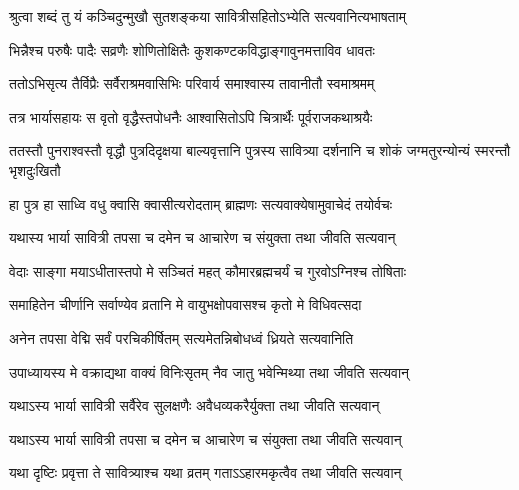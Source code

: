 \begin{center}
\twolineshloka
{श्रुत्वा शब्दं तु यं कञ्चिदुन्मुखौ सुतशङ्कया}
{सावित्रीसहितोऽभ्येति सत्यवानित्यभाषताम्}


\twolineshloka
{भिन्नैश्च परुषैः पादैः सव्रणैः शोणितोक्षितैः}
{कुशकण्टकविद्धाङ्गावुनमत्ताविव धावतः}


\twolineshloka
{ततोऽभिसृत्य तैर्विप्रैः सर्वैराश्रमवासिभिः}
{परिवार्य समाश्वास्य तावानीतौ स्वमाश्रमम्}


\twolineshloka
{तत्र भार्यासहायः स वृतो वृद्धैस्तपोधनैः}
{आश्वासितोऽपि चित्रार्थैः पूर्वराजकथाश्रयैः}


\threelineshloka
{ततस्तौ पुनराश्वस्तौ वृद्धौ पुत्रदिदृक्षया}
{बाल्यवृत्तानि पुत्रस्य सावित्र्या दर्शनानि च}
{शोकं जग्मतुरन्योन्यं स्मरन्तौ भृशदुःखितौ}


\twolineshloka
{हा पुत्र हा साध्वि वधु क्वासि क्वासीत्यरोदताम्}
{ब्राह्मणः सत्यवाक्येषामुवाचेदं तयोर्वचः}




\twolineshloka
{यथास्य भार्या सावित्री तपसा च दमेन च}
{आचारेण च संयुक्ता तथा जीवति सत्यवान्}




\twolineshloka
{वेदाः साङ्गा मयाऽधीतास्तपो मे सञ्चितं महत्}
{कौमारब्रह्मचर्यं च गुरवोऽग्निश्च तोषिताः}


\twolineshloka
{समाहितेन चीर्णानि सर्वाण्येव व्रतानि मे}
{वायुभक्षोपवासश्च कृतो मे विधिवत्सदा}


\twolineshloka
{अनेन तपसा वेद्मि सर्वं परचिकीर्षितम्}
{सत्यमेतन्निबोधध्वं ध्रियते सत्यवानिति}




\twolineshloka
{उपाध्यायस्य मे वक्राद्यथा वाक्यं विनिःसृतम्}
{नैव जातु भवेन्मिथ्या तथा जीवति सत्यवान्}




\twolineshloka
{यथाऽस्य भार्या सावित्री सर्वैरेव सुलक्षणैः}
{अवैधव्यकरैर्युक्ता तथा जीवति सत्यवान्}




\twolineshloka
{यथाऽस्य भार्या सावित्री तपसा च दमेन च}
{आचारेण च संयुक्ता तथा जीवति सत्यवान्}




\twolineshloka
{यथा दृष्टिः प्रवृत्ता ते सावित्र्याश्च यथा व्रतम्}
{गताऽऽहारमकृत्वैव तथा जीवति सत्यवान्}


\end{center}
